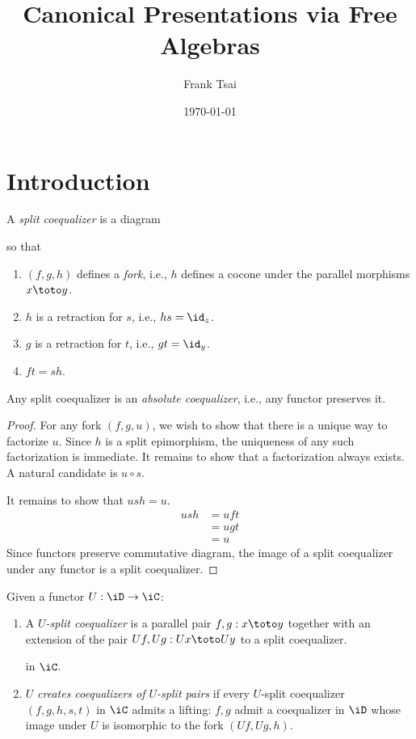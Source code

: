 \documentclass{amsart}
\title{Canonical Presentations via Free Algebras}
\author{Frank Tsai}
\date{\today}
\begin{document}
\maketitle
\tableofcontents

\section{Introduction}
\label{sec:introduction}

\begin{defn}
  A \emph{split coequalizer} is a diagram
  
  so that
  \begin{enumerate}
  \item $(f,g,h)$ defines a \emph{fork}, i.e., $h$ defines a cocone under the parallel morphisms $x \toto y$.
  \item $h$ is a retraction for $s$, i.e., $hs = \id_{z}$.
  \item $g$ is a retraction for $t$, i.e., $gt = \id_{y}$.
  \item $ft = sh$.
  \end{enumerate}
\end{defn}

\begin{lem}\label{lem:absolute-coequalizer}
  Any split coequalizer is an \emph{absolute coequalizer}, i.e., any functor preserves it.
\end{lem}
\begin{proof}
  For any fork $(f,g,u)$, we wish to show that there is a unique way to factorize $u$.
  Since $h$ is a split epimorphism, the uniqueness of any such factorization is immediate.
  It remains to show that a factorization always exists.
  A natural candidate is $u \circ s$.
  
  It remains to show that $ush = u$.
  \begin{align}
    ush &= uft\\
        &= ugt\\
        &= u
  \end{align}
  Since functors preserve commutative diagram, the image of a split coequalizer under any functor is a split coequalizer.
\end{proof}

\begin{defn}
  Given a functor $U : \iD \to \iC$:
  \begin{enumerate}
  \item A \emph{$U$-split coequalizer} is a parallel pair $f,g : x \toto y$ together with an extension of the pair $Uf,Ug : Ux \toto Uy$ to a split coequalizer.
    
    in $\iC$.
  \item $U$ \emph{creates coequalizers of $U$-split pairs} if every $U$-split coequalizer $(f,g,h,s,t)$ in $\iC$ admits a lifting: $f,g$ admit a coequalizer in $\iD$ whose image under $U$ is isomorphic to the fork $(Uf,Ug,h)$.
  \end{enumerate}
\end{defn}
\end{document}
